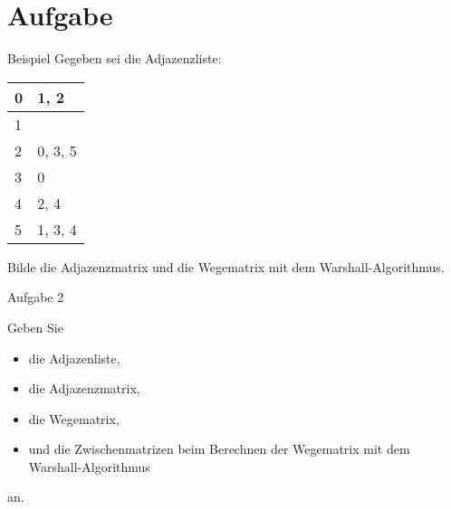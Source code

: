 \section{Aufgabe}
\begin{frame}{Beispiel}
    Gegeben sei die Adjazenzliste:
    \begin{table}
        \centering
        \begin{tabular}{|l|l|}
            \hline
            0 & 1,  2\\\hline
            1 & \\\hline
            2& 0, 3, 5\\\hline
            3 & 0\\\hline
            4 & 2, 4\\\hline
            5 & 1, 3, 4\\\hline
        \end{tabular}
    \end{table}
    Bilde die Adjazenzmatrix und die Wegematrix mit dem Warshall-Algorithmus.
\end{frame}
\begin{frame}{Aufgabe 2}


    Geben Sie
    \begin{itemize}
        \item die Adjazenliste,
        \item die Adjazenzmatrix,
        \item die Wegematrix,
        \item und die Zwischenmatrizen beim Berechnen der Wegematrix mit dem Warshall-Algorithmus
    \end{itemize}
    an.
\end{frame}



